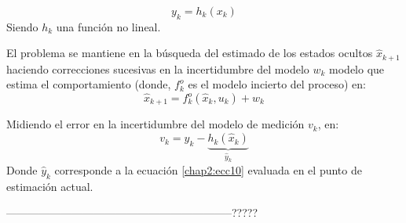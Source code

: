 \documentclass[conference]{IEEEtran}
\begin{document}
\begin{equation}
\label{chap2:ecc10}
y_{k}=h_k(x_k)
\end{equation} 
Siendo $h_k$ una función no lineal.\par El problema se mantiene en la búsqueda del estimado de los estados ocultos $\hat{x}_{k+1}$ haciendo correcciones sucesivas en la incertidumbre del modelo $w_k$ modelo que estima el comportamiento (donde, $f^o_k$ es el modelo incierto del proceso) en:
\begin{equation}
\label{chap2:ecc11}
\hat{x}_{k+1}=f^o_k(\hat{x}_k,u_k)+w_k
\end{equation}
\par
Midiendo el error en la incertidumbre del modelo de medición $v_k$, en:
\begin{equation}
\label{chap2:ecc4}
v_k=y_k-\underbrace{h_k(\hat{x}_k)}_{\hat{y}_k}
\end{equation}
Donde $\hat{y}_k$ corresponde a la ecuación \ref{chap2:ecc10} evaluada en el punto de estimación actual.\par
--------------------------------------------------------------?????
\end{document}
